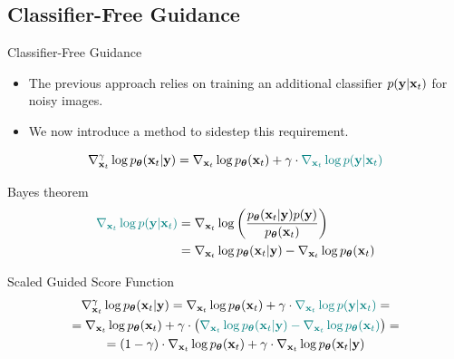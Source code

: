 \documentclass{beamer}
\renewcommand{\eqpause}{}
\renewcommand{\nextonslide}[1]{#1}
\begin{document}
\subsection{Classifier-Free Guidance}
\begin{frame}{Classifier-Free Guidance}
	\begin{itemize}
		\item The previous approach relies on training an additional classifier $p(\mathbf{y} | \mathbf{x}_t)$ for noisy images.	
		\item We now introduce a method to sidestep this requirement.
	\end{itemize}
	\eqpause
	\[
		\nabla_{\mathbf{x}_t}^{\gamma} \log p_{\boldsymbol{\theta}}(\mathbf{x}_t | \mathbf{y}) = \nabla_{\mathbf{x}_t} \log p_{\boldsymbol{\theta}}(\mathbf{x}_t) + \gamma \cdot {\color{teal}\nabla_{\mathbf{x}_t} \log p(\mathbf{y}| \mathbf{x}_t)}
	\]
	\eqpause
	\vspace{-0.5cm}
	\begin{block}{Bayes theorem}
		\vspace{-0.7cm}
		\begin{align*}
			{\color{teal}\nabla_{\bx_t} \log p(\by | \bx_t)} &= \nabla_{\bx_t} \log \left( \frac{\pt(\bx_t| \by) p(\by)}{\pt(\bx_t)} \right) \\
			\nextonslide{
			&=  \nabla_{\bx_t} \log \pt(\bx_t| \by) -\nabla_{\bx_t} \log  \pt(\bx_t)
			}
		\end{align*}
	\end{block}
	\eqpause
	\vspace{-0.5cm}
	\begin{block}{Scaled Guided Score Function}
		\vspace{-0.7cm}
		\begin{multline*}
			\nabla_{\bx_t}^{\gamma} \log \pt(\bx_t | \by) = \nabla_{\bx_t} \log \pt(\bx_t) + \gamma \cdot {\color{teal} \nabla_{\bx_t} \log p(\by | \bx_t)}
			\nextonslide{ = \\ = \nabla_{\bx_t} \log \pt(\bx_t) + \gamma \cdot \bigl( {\color{teal}\nabla_{\bx_t} \log \pt(\bx_t| \by) - \nabla_{\bx_t} \log  \pt(\bx_t)} \bigr)}
			\nextonslide{ = \\ =  (1 - \gamma) \cdot  \nabla_{\bx_t} \log \pt(\bx_t) + \gamma \cdot  \nabla_{\bx_t} \log \pt(\bx_t| \by)}
		\end{multline*}
	\end{block}
\end{frame}
\end{document}
